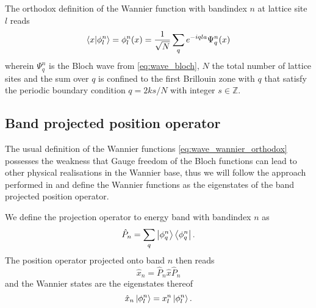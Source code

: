 The orthodox definition of the Wannier function with bandindex $n$ at lattice
site $l$ reads
\begin{equation}
  \bra{x}\ket{\phi^n_{l}}
  =\phi^n_{l}(x)
  =\frac{1}{\sqrt{N}}\sum_qe^{-iqla}\Psi^n_{q}(x)
  \label{eq:wave_wannier_orthodox}
\end{equation}
wherein $\Psi^n_{q}$ is the Bloch wave from \cref{eq:wave_bloch}, $N$ the
total number of lattice sites and the sum over $q$ is confined to the first
Brillouin zone with $q$ that satisfy the periodic boundary condition $q=2ks/N$
with integer $s\in\mathbb{Z}$.

\subsection{Band projected position operator}

The usual definition of the Wannier functions \cref{eq:wave_wannier_orthodox}
possesses the weakness that Gauge freedom of the Bloch functions can lead to
other physical realisations in the Wannier base, thus we will follow the
approach performed in \cite{Goerg2014} and define the Wannier functions
as the eigenstates of the band projected position operator.

We define the projection operator to energy band with bandindex $n$ as
\begin{equation}
  \hat{P}_n
  =\sum_q\ket{\phi^n_{q}}\bra{\phi^n_{q}}
  \label{eq:projection_band}.
\end{equation}
The position operator projected onto band $n$ then reads
\begin{equation}
  \hat{x}_n
  =\hat{P}_n\hat{x}\hat{P}_n
  \label{eq:position_projected_band}
\end{equation}
and the Wannier states are the eigenstates thereof
\begin{equation}
  \hat{x}_n\ket{\phi^n_{l}}=x^n_{l}\ket{\phi^n_{l}}
  \label{eq:eigenvalue_position_projected_band}.
\end{equation}

